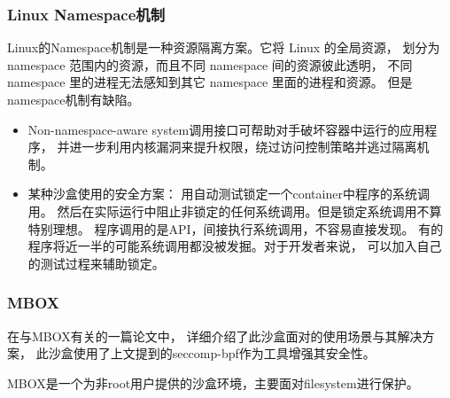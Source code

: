 \documentclass[AutoFakeBold,a4paper]{ctexart}
\begin{document}
\subsubsection{Linux Namespace机制}

Linux的Namespace机制是一种资源隔离方案。它将 Linux 的全局资源，
划分为 namespace 范围内的资源，而且不同 namespace 间的资源彼此透明，
不同 namespace 里的进程无法感知到其它 namespace 里面的进程和资源。
但是namespace机制有缺陷。

\begin{itemize}
    \item Non-namespace-aware system调用接口可帮助对手破坏容器中运行的应用程序，
    并进一步利用内核漏洞来提升权限，绕过访问控制策略并逃过隔离机制。\cite{2019Practical}
    \item 某种沙盒使用的安全方案\cite{2019Practical}：
    用自动测试锁定一个container中程序的系统调用。
    然后在实际运行中阻止非锁定的任何系统调用。但是锁定系统调用不算特别理想。
    程序调用的是API，间接执行系统调用，不容易直接发现。
    有的程序将近一半的可能系统调用都没被发掘。对于开发者来说，
    可以加入自己的测试过程来辅助锁定。
\end{itemize}

\subsubsection{MBOX}

在与MBOX有关的一篇论文\cite{180196}中，
详细介绍了此沙盒面对的使用场景与其解决方案，
此沙盒使用了上文提到的seccomp-bpf作为工具增强其安全性。

MBOX是一个为非root用户提供的沙盒环境，主要面对filesystem进行保护。
\end{document}
